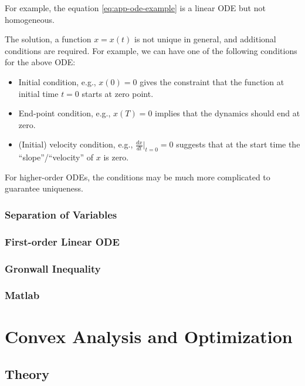 \documentclass[
]{book}
\theoremstyle{definition}
\theoremstyle{definition}
\theoremstyle{definition}
\theoremstyle{definition}
\theoremstyle{remark}
\begin{document}
For example, the equation \eqref{eq:app-ode-example} is a linear ODE but not homogeneous.

The solution, a function \(x=x(t)\) is not unique in general, and additional conditions are required. For example, we can have one of the following conditions for the above ODE:

\begin{itemize}
\item
  Initial condition, e.g., \(x(0)=0\) gives the constraint that the function at initial time \(t=0\) starts at zero point.
\item
  End-point condition, e.g., \(x(T)=0\) implies that the dynamics should end at zero.
\item
  (Initial) velocity condition, e.g., \(\frac{dx}{dt}|_{t=0}=0\) suggests that at the start time the ``slope''/``velocity'' of \(x\) is zero.
\end{itemize}

For higher-order ODEs, the conditions may be much more complicated to guarantee uniqueness.

\hypertarget{separation-of-variables}{%
\subsection{Separation of Variables}\label{separation-of-variables}}

\hypertarget{first-order-linear-ode}{%
\subsection{First-order Linear ODE}\label{first-order-linear-ode}}

\hypertarget{gronwall-inequality}{%
\subsection{Gronwall Inequality}\label{gronwall-inequality}}

\hypertarget{matlab}{%
\subsection{Matlab}\label{matlab}}

\hypertarget{appconvex}{%
\chapter{Convex Analysis and Optimization}\label{appconvex}}

\hypertarget{appconvex-theory}{%
\section{Theory}\label{appconvex-theory}}
\end{document}
